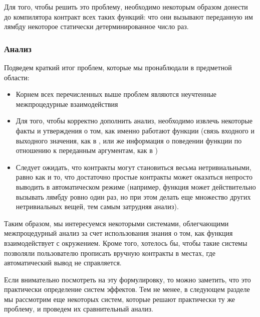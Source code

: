 Для того, чтобы решить это проблему, необходимо некоторым образом донести до компилятора контракт всех таких функций: что они вызывают переданную им лямбду некоторое статически детерминированное число раз. 



\subsubsection{Анализ}

Подведем краткий итог проблем, которые мы пронаблюдали в предметной области:

\begin{itemize}
    \item Корнем всех перечисленных выше проблем являются неучтенные межпроцедурные взаимодействия
    
    \item Для того, чтобы корректно дополнить анализ, необходимо извлечь некоторые факты и утверждения о том, как именно работают функции (связь входного и выходного значения, как в , или же информация о поведении функции по отношению к переданным аргументам, как в )
    
    \item Следует ожидать, что контракты могут становиться весьма нетривиальными, равно как и то, что достаточно простые контракты может оказаться непросто выводить в автоматическом режиме (например, функция может действительно вызывать лямбду ровно один раз, но при этом делать еще множество других нетривиальных вещей, тем самым затрудняя анализ).
\end{itemize}

Таким образом, мы интересуемся некоторыми системами, облегчающими межпроцедурный анализ за счет использования знания о том, как функция взаимодействует с окружением. Кроме того, хотелось бы, чтобы такие системы позволяли пользователю прописать вручную контракты в местах, где автоматический вывод не справляется.

Если внимательно посмотреть на эту формулировку, то можно заметить, что это практически определение систем эффектов. Тем не менее, в следующем разделе мы рассмотрим еще некоторых систем, которые решают практически ту же проблему, и проведем их сравнительный анализ.

